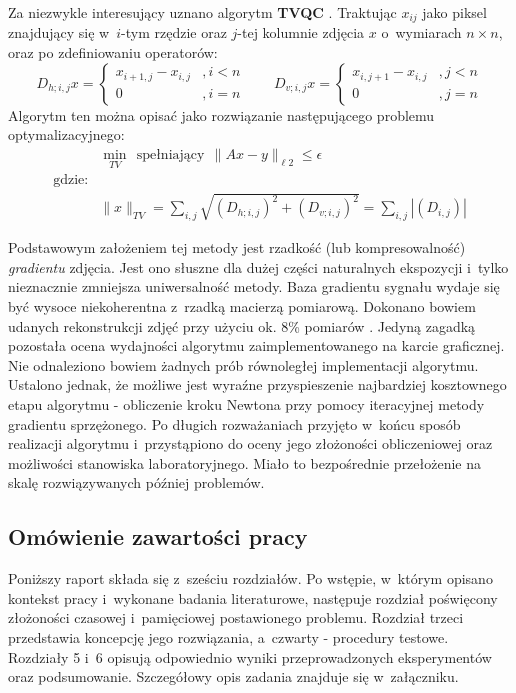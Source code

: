 Za niezwykle interesujący uznano algorytm \textbf{TVQC} \cite{Candes2005a,Candes2005b}. Traktując $x_{ij}$ jako piksel znajdujący się w~$i$-tym rzędzie oraz $j$-tej kolumnie zdjęcia $x$ o~wymiarach $n \times n$, oraz po zdefiniowaniu operatorów:
\begin{equation}
	D_{h;i,j}x = \begin{cases}
					x_{i+1,j} - x_{i,j} &, i < n \\
					0 &, i = n 
				 \end{cases} 
				 \qquad
	D_{v;i,j}x = \begin{cases}
					x_{i,j+1} - x_{i,j} &, j < n \\
					0 &, j = n
				 \end{cases}			 
\end{equation}
Algorytm ten można opisać jako rozwiązanie następującego problemu optymalizacyjnego:
\begin{equation}
\begin{split}
& \min_{TV} ~~\text{spełniający}~~\|Ax - y \|_{\ell 2} \le \epsilon \\
\text{gdzie:} &\\
              & \|x \|_{TV} = \sum_{i,j} \sqrt{ \left( D_{h;i,j} \right)^2 + \left( D_{v;i,j} \right) ^2} = \sum_{i,j}|\left(D_{i,j}\right) |
\label{eq:TV}
\end{split}
\end{equation}

Podstawowym założeniem tej metody jest rzadkość (lub kompresowalność) \textit{gradientu} zdjęcia. Jest ono słuszne dla dużej części naturalnych ekspozycji i~tylko nieznacznie zmniejsza uniwersalność metody. Baza gradientu sygnału wydaje się być wysoce niekoherentna z~rzadką macierzą pomiarową. Dokonano bowiem udanych rekonstrukcji zdjęć przy użyciu ok. 8\% pomiarów \cite{Berinde2008}. Jedyną zagadką pozostała ocena wydajności algorytmu zaimplementowanego na karcie graficznej. Nie odnaleziono bowiem żadnych prób równoległej implementacji algorytmu. Ustalono jednak\cite{Tarsa2012, Bolz2003}, że możliwe jest wyraźne przyspieszenie najbardziej kosztownego etapu algorytmu - obliczenie kroku Newtona przy pomocy iteracyjnej metody gradientu sprzężonego. Po długich rozważaniach przyjęto w~końcu sposób realizacji algorytmu i~przystąpiono do oceny jego złożoności obliczeniowej oraz możliwości stanowiska laboratoryjnego. Miało to bezpośrednie przełożenie na skalę rozwiązywanych później problemów.

\subsection{Omówienie zawartości pracy}
Poniższy raport składa się z~sześciu rozdziałów. Po wstępie, w~którym opisano kontekst pracy i~wykonane badania literaturowe, następuje rozdział poświęcony złożoności czasowej i~pamięciowej postawionego problemu. Rozdział trzeci przedstawia koncepcję jego rozwiązania, a~czwarty - procedury testowe. Rozdziały 5 i~6 opisują odpowiednio wyniki przeprowadzonych eksperymentów oraz podsumowanie. Szczegółowy opis zadania znajduje się w~załączniku.
